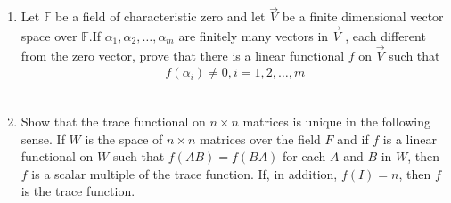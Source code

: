 \begin{enumerate}[label=\thesubsection.\arabic*.,ref=\thesubsection.\theenumi]
%
\\
\solution
%
\item Let $\mathbb{F}$ be a field of characteristic zero and let $\vec{V}$ be a finite dimensional vector space over  $\mathbb{F}$.If $\alpha_1,\alpha_2,\hdots,\alpha_m$ are finitely many vectors in $\vec{V}$ , each different from the zero vector, prove that there is a linear functional $f$ on $\vec{V}$ such that
\begin{align}
    f(\alpha_i) \neq 0, i=1,2,\hdots,m
\end{align}
%
\\
\solution

\item Show that the trace functional on $n\times n$ matrices is unique in the following sense. If $W$ is the space of $n \times n$ matrices over the field $F$ and if $f$ is a linear functional on $W$ such that $f(AB) = f(BA)$ for each $A$ and $B$ in $W$, then $f$ is a scalar multiple of the trace function. If, in addition, $f(I)=n$, then $f$ is the trace function.
\\
\solution

\end{enumerate}
